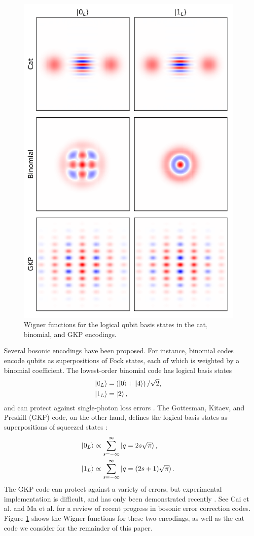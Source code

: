 \begin{figure}[t]
    \centering
    \includegraphics[width=0.8\columnwidth]{figures/cat_binom_gkp.pdf}
    \caption{Wigner functions for the logical qubit basis states in the cat, binomial, and GKP encodings.}
    \label{fig:cat_binom_gkp}
\end{figure}

Several bosonic encodings have been proposed.
For instance, binomial codes encode qubits as superpositions of Fock states, each of which is weighted by a binomial coefficient.
The lowest-order binomial code has logical basis states
\begin{align*}
    \ket{0_L} &= \left ( \ket{0} + \ket{4} \right ) / \sqrt{2}, \\
    \ket{1_L} &= \ket{2},
\end{align*}
and can protect against single-photon loss errors \cite{cai_2021,michael_2016}.
The Gottesman, Kitaev, and Preskill (GKP) code, on the other hand, defines the logical basis states as superpositions of squeezed states \cite{gottesman_2001}:
\begin{align*}
    \ket{0_L} &\propto \sum_{s=-\infty}^{\infty} \ket{q = 2 s \sqrt{\pi}}, \\
    \ket{1_L} &\propto \sum_{s=-\infty}^{\infty} \ket{q = (2 s + 1) \sqrt{\pi}}.
\end{align*}
The GKP code can protect against a variety of errors, but experimental implementation is difficult, and has only been demonstrated recently \cite{campagne_ibarcq_2020}.
See Cai et al. and Ma et al. \cite{cai_2021, ma_2021} for a review of recent progress in bosonic error correction codes.
Figure \ref{fig:cat_binom_gkp} shows the Wigner functions for these two encodings, as well as the cat code we consider for the remainder of this paper.

